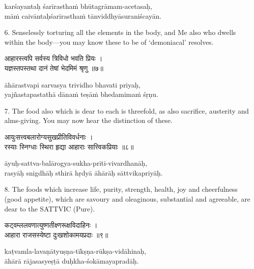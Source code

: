 \begin{transliteration}
karśayantaḥ śarīrasthaṁ bhūtagrāmam-acetasaḥ, \\
māṁ caivāntaḥśarīrasthaṁ tānviddhyāsuraniścayān.
\end{transliteration}

6. Senselessly torturing all the elements in the body, and Me also who dwells
within the body---you may know these to be of `demoniacal' resolves.

\begin{gitaverse}
आहारस्त्वपि सर्वस्य त्रिविधो भवति प्रियः । \\
यज्ञस्तपस्तथा दानं तेषां भेदमिमं श्रृणु ॥७॥
\end{gitaverse}

\begin{transliteration}
āhārastvapi sarvasya trividho bhavati priyaḥ, \\
yajñastapastathā dānaṁ teṣāṁ bhedamimaṁ śṛṇu.
\end{transliteration}

7. The food also which is dear to each is threefold, as also sacrifice,
austerity and alms-giving. You may now hear the distinction of these.

\begin{gitaverse}
आयुःसत्त्वबलारोग्यसुखप्रीतिविवर्धनाः । \\
रस्याः स्निग्धाः स्थिरा हृद्या आहाराः सात्त्विकप्रियाः ॥८॥
\end{gitaverse}

\begin{transliteration}
āyuḥ-sattva-balārogya-sukha-prīti-vivardhanāḥ, \\
rasyāḥ snigdhāḥ sthirā hṛdyā āhārāḥ sāttvikapriyāḥ.
\end{transliteration}

8. The foods which increase life, purity, strength, health, joy and
cheerfulness (good appetite), which are savoury and oleaginous, substantial and
agreeable, are dear to the SATTVIC (Pure).

\begin{gitaverse}
कट्वम्ललवणात्युष्णतीक्ष्णरूक्षविदाहिनः । \\
आहारा राजसस्येष्टा दुःखशोकामयप्रदाः ॥९॥
\end{gitaverse}

\begin{transliteration}
kaṭvamla-lavaṇātyuṣṇa-tīkṣṇa-rūkṣa-vidāhinaḥ, \\
āhārā rājasasyeṣṭā duḥkha-śokāmayapradāḥ.
\end{transliteration}

